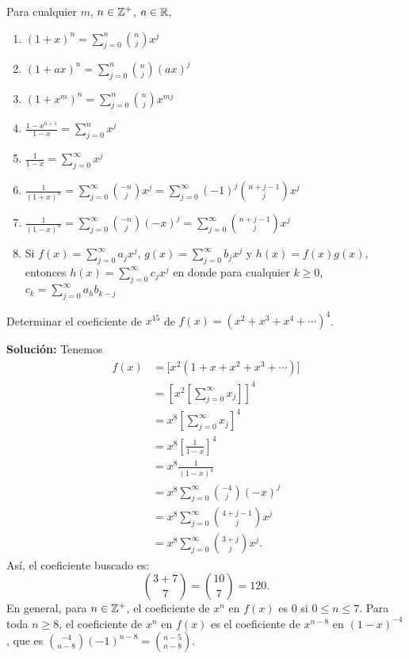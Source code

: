 \begin{BOX}
    Para cualquier $m$, $n \in \ZZ[+]$, $a \in \RR$,
    \begin{enumerate}
        \item $\displaystyle (1 + x)^n = \sum_{j=0}^{n} \binom{n}{j} x^j$
        \item $\displaystyle (1 + ax)^n = \sum_{j=0}^{n} \binom{n}{j} (ax)^j$
        \item $\displaystyle \left(1 + x^m\right)^n = \sum_{j=0}^{n} \binom{n}{j} x^{mj}$
        \item $\displaystyle \frac{1-x^{n+1}}{1-x} = \sum_{j=0}^n x^j$
        \item $\displaystyle \frac{1}{1-x} = \sum_{j=0}^{\infty} x^j$
        \item $\displaystyle \frac{1}{(1+x)^n} = \sum_{j=0}^{\infty} \binom{-n}{j}x^j = \sum_{j=0}^{\infty} (-1)^j \binom{n+j-1}{j} x^j$
        \item $\displaystyle \frac{1}{(1-x)^n} = \sum_{j=0}^{\infty} \binom{-n}{j}(-x)^j = \sum_{j=0}^{\infty} \binom{n+j-1}{j}x^j$
        \item Si $\displaystyle f(x) = \sum_{j=0}^{\infty} a_j x^j$, $\displaystyle g(x) = \sum_{j=0}^{\infty} b_j x^j$ y $h(x) = f(x)g(x)$, entonces $\displaystyle h(x) = \sum_{j=0}^{\infty} c_j x^j$ en donde para cualquier $k \geq 0$, $\displaystyle c_k = \sum_{j=0}^{\infty} a_h b_{k-j}$
    \end{enumerate}
\end{BOX}

\begin{myexample}
    Determinar el coeficiente de $x^{15}$ de $f(x) = \left( x^2 + x^3 + x^4 + \cdots \right)^4$.

    \tcblower
    \textbf{\color{jblueleft}Solución:} Tenemos
    \begin{align*}
        f(x) & = \big[ x^2 (1 + x + x^2 + x^3 + \cdots ) \big] \\
        & = \left[ x^2 \left[ \sum_{j=0}^{\infty} x_j \right] \right]^4 \\
        & = x^8 \left[ \sum_{j=0}^{\infty} x_j \right]^4 \\
        & = x^8 \left[ \frac{1}{1-x} \right]^4 \\
        & = x^8 \frac{1}{(1-x)^4} \\
        & = x^8 \sum_{j=0}^{\infty} \binom{-4}{j} (-x)^j \\
        & = x^8 \sum_{j=0}^{\infty} \binom{4+j-1}{j} x^j \\
        & = x^8 \sum_{j=0}^{\infty} \binom{3+j}{j} x^j.
    \end{align*}
    Así, el coeficiente buscado es:
    $$\binom{3+7}{7} = \binom{10}{7} = 120.$$
    En general, para $n \in \ZZ[+]$, el coeficiente de $x^n$ en $f(x)$ es 0 si $0 \leq n \leq 7$. Para toda $n \geq 8$, el coeficiente de $x^n$ en $f(x)$ es el coeficiente de $x^{n-8}$ en $(1-x)^{-4}$, que es $\displaystyle \binom{-4}{n-8}(-1)^{n-8} = \binom{n-5}{n-8}$.
\end{myexample}

